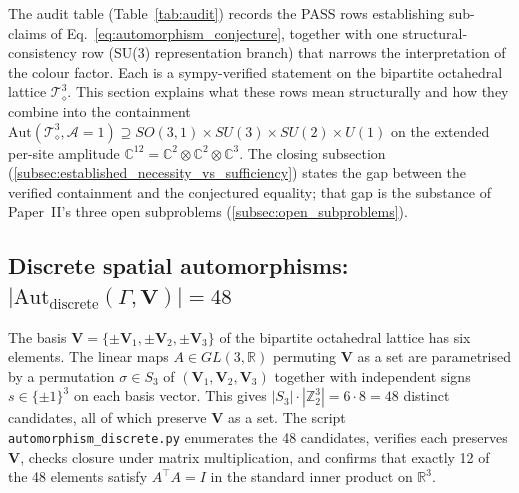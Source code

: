 
\label{sec:established_factors}

The audit table (Table~\ref{tab:audit}) records the PASS rows
establishing sub-claims of Eq.~\eqref{eq:automorphism_conjecture},
together with one structural-consistency row (SU(3) representation
branch) that narrows the interpretation of the colour factor.  Each
is a sympy-verified statement on the bipartite octahedral lattice
$\mathcal{T}_\diamond^3$.  This section explains what these rows
mean structurally and how they combine into the containment
$\mathrm{Aut}(\mathcal{T}_\diamond^3, \mathcal{A}=1) \supseteq SO(3,1)
\times SU(3) \times SU(2) \times U(1)$ on the extended per-site
amplitude $\mathbb{C}^{12} = \mathbb{C}^2 \otimes \mathbb{C}^2
\otimes \mathbb{C}^3$.  The closing subsection
(\autoref{subsec:established_necessity_vs_sufficiency}) states the
gap between the verified containment and the conjectured equality;
that gap is the substance of Paper~II's three open subproblems
(\autoref{subsec:open_subproblems}).

\subsection{Discrete spatial automorphisms: $|\mathrm{Aut}_\text{discrete}(\Gamma, \mathbf{V})| = 48$}
\label{subsec:discrete_spatial}

The basis $\mathbf{V} = \{\pm\mathbf{V}_1, \pm\mathbf{V}_2,
\pm\mathbf{V}_3\}$ of the bipartite octahedral lattice has six
elements.  The linear maps $A \in GL(3,\mathbb{R})$ permuting
$\mathbf{V}$ as a set are parametrised by a permutation $\sigma \in
S_3$ of $(\mathbf{V}_1, \mathbf{V}_2, \mathbf{V}_3)$ together with
independent signs $s \in \{\pm 1\}^3$ on each basis vector.  This
gives $|S_3| \cdot |\mathbb{Z}_2^3| = 6 \cdot 8 = 48$ distinct
candidates, all of which preserve $\mathbf{V}$ as a set.  The script
\nolinkurl{automorphism_discrete.py} enumerates the 48 candidates,
verifies each preserves $\mathbf{V}$, checks closure under matrix
multiplication, and confirms that exactly 12 of the 48 elements
satisfy $A^\top A = I$ in the standard inner product on
$\mathbb{R}^3$.


